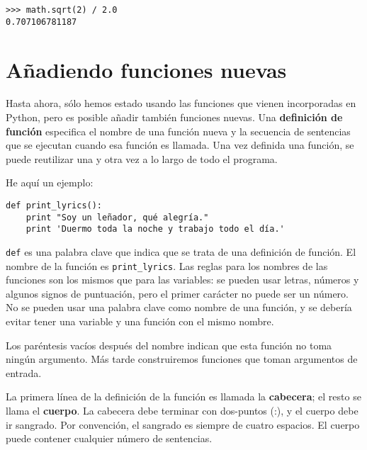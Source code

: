 
\beforeverb
\begin{verbatim}
>>> math.sqrt(2) / 2.0
0.707106781187
\end{verbatim}
\afterverb
%


\section{Añadiendo funciones nuevas}

Hasta ahora, sólo hemos estado usando las funciones que vienen incorporadas en Python,
pero es posible añadir también funciones nuevas.
Una {\bf definición de función} especifica el nombre de una función nueva y
la secuencia de sentencias que se ejecutan cuando esa función es llamada.
Una vez definida una función, se puede reutilizar una y otra vez
a lo largo de todo el programa.


He aquí un ejemplo:

\beforeverb
\begin{verbatim}
def print_lyrics():
    print "Soy un leñador, qué alegría."
    print 'Duermo toda la noche y trabajo todo el día.'
\end{verbatim}
\afterverb
%
{\tt def} es una palabra clave que indica que se trata de una definición
de función. El nombre de la función es \verb"print_lyrics". Las
reglas para los nombres de las funciones son los mismos que para las variables:
se pueden usar letras, números y algunos signos de puntuación, pero el primer carácter
no puede ser un número. No se pueden usar una palabra clave como nombre de una función,
y se debería evitar tener una variable y una función con el mismo
nombre.


Los paréntesis vacíos después del nombre indican que esta función
no toma ningún argumento. Más tarde construiremos funciones que
toman argumentos de entrada.


La primera línea de la definición de la función es llamada la {\bf cabecera};
el resto se llama el {\bf cuerpo}. La cabecera debe terminar con dos-puntos (:),
y el cuerpo debe ir sangrado. Por convención, el sangrado es
siempre de cuatro espacios. El cuerpo puede contener
cualquier número de sentencias.

